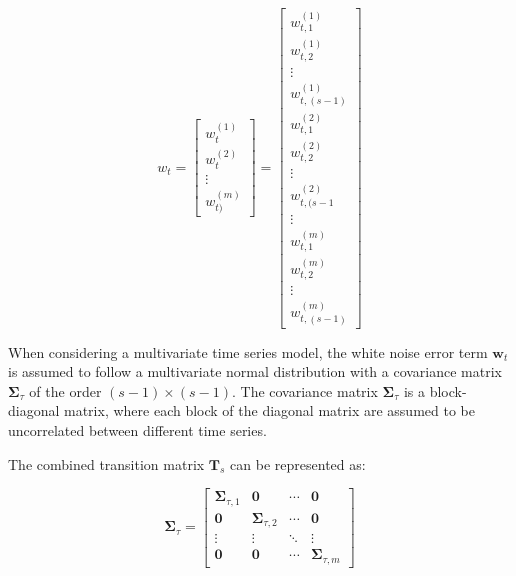     \begin{equation}
        w_t=
            \left[
                \begin{array}{c}
                    w_{t}^{(1)} \\
                    w_{t}^{(2)} \\
                    \vdots \\
                    w_{t)}^{(m)}
                \end{array}
            \right]
           =
            \left[
                \begin{array}{c}
                    w_{t, 1}^{(1)} \\
                    w_{t, 2}^{(1)} \\
                    \vdots \\
                    w_{t, (s-1)}^{(1)} \\
                    w_{t, 1}^{(2)} \\
                    w_{t, 2}^{(2)} \\
                    \vdots \\
                    w_{t, (s-1}^{(2)} \\
                    \vdots \\
                    w_{t, 1}^{(m)} \\
                    w_{t, 2}^{(m)} \\
                    \vdots \\
                    w_{t, (s-1)}^{(m)}
                \end{array}
            \right]
    \label{eq:seasonal_error}
    \end{equation}

    When considering a multivariate time series model, the white noise error term $\bm{w}_{t}$ is assumed to follow
    a multivariate normal distribution with a covariance matrix $\bm{\Sigma}_{\tau}$ of the order $(s-1) \times (s-1)$.
    The covariance matrix $\bm{\Sigma}_{\tau}$ is a block-diagonal matrix, where each block of the diagonal matrix are
    assumed to be uncorrelated between different time series.

    The combined transition matrix $\mathbf{T}_{s}$ can be represented as:

    \begin{equation}
        \bm{\Sigma}_{\tau} =
            \left[
                \begin{array}{cccc}
                    \mathbf{\Sigma}_{\tau, 1} & \mathbf{0}                 & \cdots & \mathbf{0} \\
                    \mathbf{0}                & \mathbf{\Sigma}_{\tau, 2}  & \cdots & \mathbf{0} \\
                    \vdots                    & \vdots                     & \ddots & \vdots     \\
                    \mathbf{0}                & \mathbf{0}                 & \cdots & \mathbf{\Sigma}_{\tau, m}
                \end{array}
            \right]
    \label{eq:seasonal_covariance}
    \end{equation}


